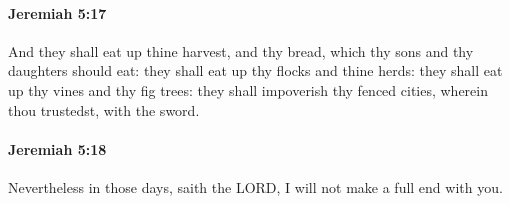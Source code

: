 		\paragraph{Jeremiah 5:17} %
			\label{JEREMIAH-5-17}

			And they shall eat up thine harvest, and thy bread, which thy sons and thy daughters should eat: they shall eat up thy flocks and thine herds: they shall eat up thy vines and thy fig trees: they shall impoverish thy fenced cities, wherein thou trustedst, with the sword.


		\paragraph{Jeremiah 5:18} %
			\label{JEREMIAH-5-18}

			Nevertheless in those days, saith the LORD, I will not make a full end with you.


